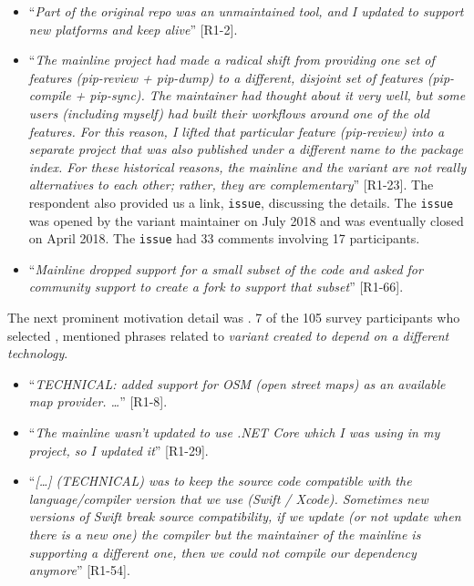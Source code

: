 \begin{itemize}[leftmargin=*]
\item ``\emph{Part of the original repo was an unmaintained tool, and I updated to support new platforms and keep alive}'' [R1-2].
\item ``\emph{The mainline project had made a radical shift from providing one set of features (pip-review + pip-dump) to a different, disjoint set of features (pip-compile + pip-sync). The maintainer had thought about it very well, but some users (including myself) had built their workflows around one of the old features. For this reason, I lifted that particular feature (pip-review) into a separate project that was also published under a different name to the package index. For these historical reasons, the mainline and the variant are not really alternatives to each other; rather, they are complementary}'' [R1-23]. The respondent also provided us a link, \gh \texttt{issue}, discussing the details. The \texttt{issue} was opened by the variant maintainer on July 2018 and was eventually closed on April 2018. The \texttt{issue} had 33 comments involving 17 participants. 
\item ``\emph{Mainline dropped support for a small subset of the code and asked for community support to create a fork to support that subset}'' [R1-66].
\end{itemize}

\nd The next prominent  motivation detail was .
7 of the 105 survey participants who selected , mentioned phrases related to \emph{variant created to depend on a different technology}.

\begin{itemize}[leftmargin=*]
\item ``\emph{TECHNICAL: added support for OSM (open street maps) as an available map provider. \ldots}'' [R1-8].
\item ``\emph{The mainline wasn't updated to use .NET Core which I was using in my project, so I updated it}'' [R1-29].
\item ``\emph{[\dots] (TECHNICAL) was to keep the source code compatible with the language/compiler version that we use (Swift / Xcode). Sometimes new versions of Swift break source compatibility, if we update (or not update when there is a new one) the compiler but the maintainer of the mainline is supporting a different one, then we could not compile our dependency anymore}'' [R1-54].
\end{itemize}

